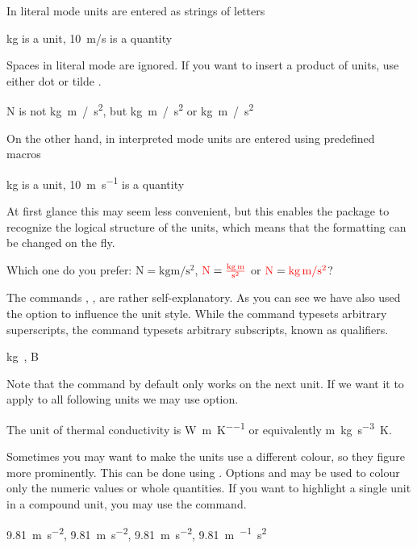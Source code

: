 In literal mode units are entered as strings of letters
\begin{example}
\unit{kg} is a unit,
\qty{10}{m/s} is a quantity
\end{example}
Spaces in literal mode are ignored. If you want to insert a product of units,
use either dot  or tilde \ai{\~{}}.
\begin{example}
\unit{N} is 
not \unit{kg m / s^2},
but \unit{kg.m / s^2}
or \unit{kg~m / s^2}
\end{example}

On the other hand, in interpreted mode units are entered using predefined
macros
\begin{example}
\unit{\kilo\gram} is a unit,
\qty{10}{\metre\per\second}
is a quantity
\end{example}
At first glance this may seem less convenient, but this enables the package to
recognize the logical structure of the units, which means that the formatting
can be changed on the fly.
\begin{example}[examplewidth=0.8\linewidth, vertical_mode]
Which one do you prefer:
\(\unit{\newton} = \unit{
  \kilo\gram\metre\per\square\second}\),
\(\unit{\newton} = \unit[per-mode = fraction]{
  \kilo\gram\metre\per\second\squared}\) or
\(\unit{\N} = \unit[per-mode = symbol]{
  \kg\m\per\s\tothe{2}}\)?
\end{example}
The commands , ,  are rather self-explanatory. As you
can see we have also used the  option to influence the unit
style. While the command  typesets arbitrary superscripts, the
command  typesets arbitrary subscripts, known as qualifiers.
\begin{example}
\unit{\kg{}},
\unit{\bel{}}
\end{example}

Note that the  command by default only works on the next unit. If we
want it to apply to all following units we may use  option.
\begin{example}[examplewidth=0.7\linewidth, vertical_mode]
The unit of thermal conductivity is
\unit{\watt\per\metre\per\kelvin}
or equivalently
\unit[sticky-per]{\m\kg\per\s\cubed\K}. 
\end{example}

Sometimes you may want to make the units use a different colour, so they figure
more prominently. This can be done using . Options
 and  may be used to colour only the numeric
values or whole quantities. If you want to highlight a single unit in a
compound unit, you may use the  command.
\begin{example}[examplewidth=0.8\linewidth, vertical_mode]
\qty[unit-color = red   ]{9.81}{\m\per\s\squared},
\qty[number-color = blue]{9.81}{\m\per\s\squared},
\qty[color = green      ]{9.81}{\m\per\s\squared},
\qty{9.81}{\m\per{}\s\squared}
\end{example}

